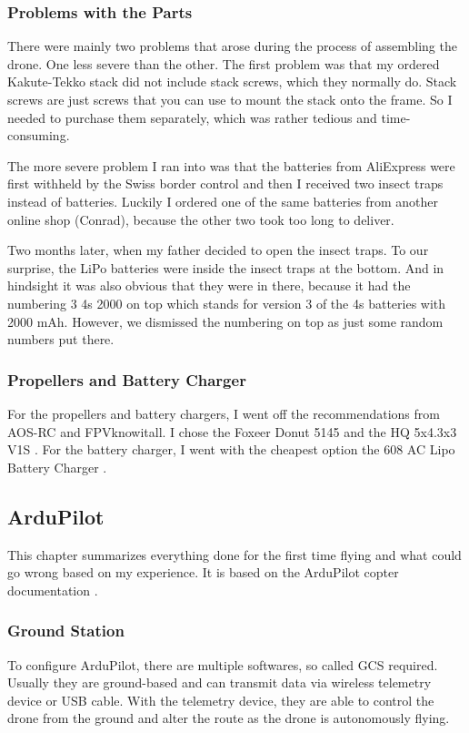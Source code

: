 \documentclass[svgnames]{article}
\begin{document}
	\subsubsection{Problems with the Parts}

	There were mainly two problems that arose during the process of assembling the drone. One less severe than the other. The first problem was that my ordered Kakute-Tekko stack did not include stack screws, which they normally do. Stack screws are just screws that you can use to mount the stack onto the frame. So I needed to purchase them separately, which was rather tedious and time-consuming.
	
	The more severe problem I ran into was that the batteries from AliExpress were first withheld by the Swiss border control and then I received two insect traps instead of batteries. Luckily I ordered one of the same batteries from another online shop (Conrad), because the other two took too long to deliver.
	
	Two months later, when my father decided to open the insect traps. To our surprise, the LiPo batteries were inside the insect traps at the bottom. And in hindsight it was also obvious that they were in there, because it had the numbering 3 4s 2000 on top which stands for version 3 of the 4s batteries with 2000 mAh. However, we dismissed the numbering on top as just some random numbers put there. 
	
	\subsubsection{Propellers and Battery Charger}
	For the propellers and battery chargers, I went off the recommendations from AOS-RC and FPVknowitall. I chose the Foxeer Donut 5145  and the HQ 5x4.3x3 V1S \cite{toroidal, hqprops}. For the battery charger, I went with the cheapest option the 608 AC Lipo Battery Charger \cite{lipocharger}.

	\subsection{ArduPilot}
	This chapter summarizes everything done for the first time flying and what could go wrong based on my experience. It is based on the ArduPilot copter documentation \cite{ardupilotdocs}.
	
	\subsubsection{Ground Station}
	To configure ArduPilot, there are multiple softwares, so called \gls{GCS} required. Usually they are ground-based and can transmit data via wireless telemetry device or USB cable.  With the telemetry device, they are able to control the drone from the ground and alter the route as the drone is autonomously flying. 
	
\end{document}

